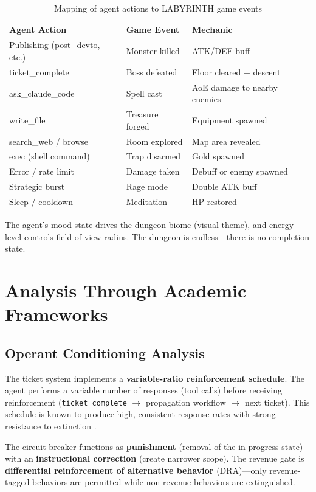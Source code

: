 \documentclass[12pt,a4paper]{article}
\begin{document}
\begin{table}[h]
\centering
\begin{tabular}{@{}lll@{}}
\toprule
\textbf{Agent Action} & \textbf{Game Event} & \textbf{Mechanic} \\
\midrule
Publishing (post\_devto, etc.) & Monster killed & ATK/DEF buff \\
ticket\_complete & Boss defeated & Floor cleared + descent \\
ask\_claude\_code & Spell cast & AoE damage to nearby enemies \\
write\_file & Treasure forged & Equipment spawned \\
search\_web / browse & Room explored & Map area revealed \\
exec (shell command) & Trap disarmed & Gold spawned \\
Error / rate limit & Damage taken & Debuff or enemy spawned \\
Strategic burst & Rage mode & Double ATK buff \\
Sleep / cooldown & Meditation & HP restored \\
\bottomrule
\end{tabular}
\caption{Mapping of agent actions to LABYRINTH game events}
\label{tab:dungeon-mapping}
\end{table}

The agent's mood state drives the dungeon biome (visual theme), and energy level controls field-of-view radius. The dungeon is endless---there is no completion state.

\section{Analysis Through Academic Frameworks}

\subsection{Operant Conditioning Analysis}

The ticket system implements a \textbf{variable-ratio reinforcement schedule}. The agent performs a variable number of responses (tool calls) before receiving reinforcement (\texttt{ticket\_complete} $\rightarrow$ propagation workflow $\rightarrow$ next ticket). This schedule is known to produce high, consistent response rates with strong resistance to extinction \citep{ferster1957schedules}.

The circuit breaker functions as \textbf{punishment} (removal of the in-progress state) with an \textbf{instructional correction} (create narrower scope). The revenue gate is \textbf{differential reinforcement of alternative behavior} (DRA)---only revenue-tagged behaviors are permitted while non-revenue behaviors are extinguished.
\end{document}
